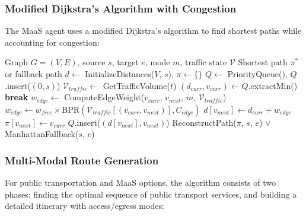 \subsubsection{Modified Dijkstra's Algorithm with Congestion}
The MaaS agent uses a modified Dijkstra's algorithm to find shortest paths while accounting for congestion:

\begin{algorithm}
\caption{Congestion-Aware Shortest Path Algorithm}
\label{alg:congestion-dijkstra}
\begin{algorithmic}[1]
\Require Graph $G = (V, E)$, source $s$, target $e$, mode $m$, traffic state $\mathcal{V}$
\Ensure Shortest path $\pi^*$ or fallback path
\State $d \gets$ InitializeDistances($V$, $s$), $\pi \gets \{\}$
\State $Q \gets$ PriorityQueue(), $Q$.insert($(0, s)$)
\State $\mathcal{V}_{traffic} \gets$ GetTrafficVolume($t$)
    \State $(d_{curr}, v_{curr}) \gets Q$.extractMin()
        \State \textbf{break}
    \EndIf
        \State $w_{edge} \gets$ ComputeEdgeWeight($v_{curr}$, $v_{next}$, $m$, $\mathcal{V}_{traffic}$)
            \State $w_{edge} \gets w_{free} \times \text{BPR}(\mathcal{V}_{traffic}[(v_{curr}, v_{next})], C_{edge})$
        \EndIf
            \State $d[v_{next}] \gets d_{curr} + w_{edge}$
            \State $\pi[v_{next}] \gets v_{curr}$
            \State $Q$.insert($(d[v_{next}], v_{next})$)
        \EndIf
    \EndFor
\EndWhile
\State \Return ReconstructPath($\pi$, $s$, $e$) $\lor$ ManhattanFallback($s$, $e$)
\end{algorithmic}
\end{algorithm}

\subsubsection{Multi-Modal Route Generation}
For public transportation and MaaS options, the algorithm consists of two phases: finding the optimal sequence of public transport services, and building a detailed itinerary with access/egress modes:

